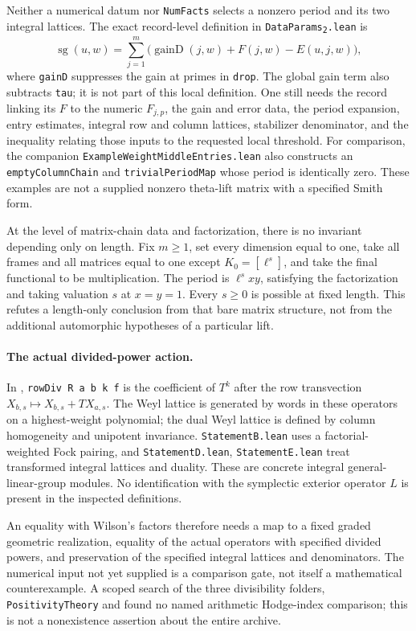 Neither a numerical datum nor \texttt{NumFacts} selects a nonzero period
and its two integral lattices.  The exact record-level definition in
\texttt{DataParams\textsubscript{2}.lean} is
\[
 \operatorname{sg}(u,w)=\sum_{j=1}^m
   \bigl(\operatorname{gainD}(j,w)+F(j,w)-E(u,j,w)\bigr),
\]
where \texttt{gainD} suppresses the gain at primes in \texttt{drop}.
The global gain term also subtracts \texttt{tau}; it is not part of this
local definition.  One still needs the record linking its $F$ to the
numeric $F_{j,p}$, the gain and error data, the period expansion, entry
estimates, integral row and column lattices, stabilizer denominator, and
the inequality relating those inputs to the requested local threshold.
For comparison, the companion \texttt{ExampleWeightMiddleEntries.lean}
also constructs an \texttt{emptyColumnChain} and
\texttt{trivialPeriodMap} whose period is identically zero.  These examples
are not a supplied nonzero theta-lift matrix with a specified Smith form.

At the level of matrix-chain data and factorization, there is no invariant
depending only on length.  Fix $m\ge1$, set every dimension equal to one,
take all frames and all matrices equal to one except $K_0=[\ell^s]$, and
take the final functional to be multiplication.  The period is
$\ell^sxy$, satisfying the factorization and taking valuation $s$ at
$x=y=1$.  Every $s\ge0$ is possible at fixed length.  This refutes a
length-only conclusion from that bare matrix structure, not from the
additional automorphic hypotheses of a particular lift.

\paragraph{The actual divided-power action.}
In ,
\texttt{rowDiv R a b k f} is the coefficient of $T^k$ after the row
transvection $X_{b,s}\mapsto X_{b,s}+TX_{a,s}$.  The Weyl lattice is
generated by words in these operators on a highest-weight polynomial;
the dual Weyl lattice is defined by column homogeneity and unipotent
invariance.  \texttt{StatementB.lean} uses a factorial-weighted Fock
pairing, and \texttt{StatementD.lean}, \texttt{StatementE.lean}
treat transformed integral lattices and duality.  These are concrete
integral general-linear-group modules.  No identification with the
symplectic exterior operator $L$ is present in the inspected definitions.

An equality with Wilson's factors therefore needs a map to a fixed graded
geometric realization, equality of the actual operators with specified
divided powers, and preservation of the specified integral lattices and
denominators.  The numerical input not yet supplied is a comparison gate,
not itself a mathematical counterexample.  A scoped search of the three
divisibility folders, \texttt{PositivityTheory} and
 found no named arithmetic Hodge-index
comparison; this is not a nonexistence assertion about the entire archive.

